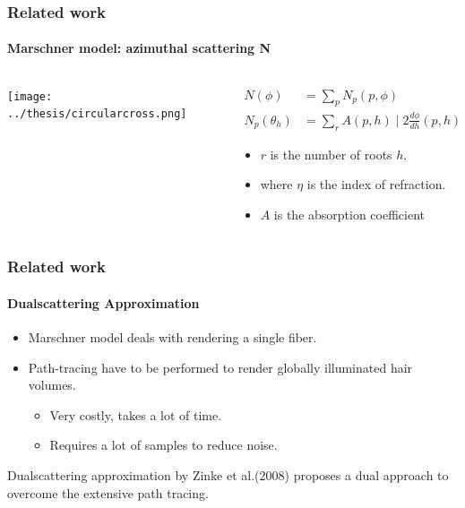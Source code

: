 \documentclass{beamer}
\begin{document}
  \begin{frame}
  \frametitle{Related work}
  \framesubtitle{Marschner model: azimuthal scattering N}
  
  \begin{columns}[onlytextwidth]
    \begin{column}{.50\textwidth}
    	\texttt{[image: ../thesis/circularcross.png]}
    \end{column}

    \begin{column}{.50\textwidth}
    \begin{align*}
  N(\phi) &= \sum_p N_p(p, \phi) \\
  N_p(\theta_h) &= \sum_r A(p, h) \mid 2 \frac{d\phi}{dh}(p, h)\mid
  \end{align*}
   \begin{itemize}
  \item $r$ is the number of roots $h$.
  \item where $\eta$ is the index of refraction.
  \item $A$ is the absorption coefficient
  \end{itemize}
    \end{column}
    \end{columns}
  
 
  \end{frame}
  
  \begin{frame}
    \frametitle{Related work}
    \framesubtitle{Dualscattering Approximation}

\begin{itemize}
\item Marschner model deals with rendering a single fiber.
	
\item Path-tracing have to be performed to render globally illuminated hair volumes.

\begin{itemize}
\item Very costly, takes a lot of time.
\item Requires a lot of samples to reduce noise.
\end{itemize}
\end{itemize}

Dualscattering approximation by Zinke et al.(2008) proposes a dual approach to overcome the extensive path tracing.

  \end{frame}  
  
\end{document}
